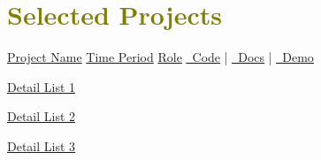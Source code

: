 
\section{\textcolor{olive}{\textbf{Selected Projects}}}
    \resumeSubHeadingListStart

    \resumeSubheading
        {\underline{Project Name}}
        {\underline{Time Period}}
        {\underline{Role}}
        {\href{https://github.com/1chooo/1chooo.com}{\underline{\faGithub\ Code}} | \href{https://docs.1chooo.com}{\underline{{\faBook}\ Docs}} | \href{https://1chooo.com}{\underline{\faDesktop\ Demo}}}

        \resumeItemListStart
            \item \underline{Detail List 1}
            \item \underline{Detail List 2}
            \item \underline{Detail List 3}
        \resumeItemListEnd

    \resumeSubHeadingListEnd
